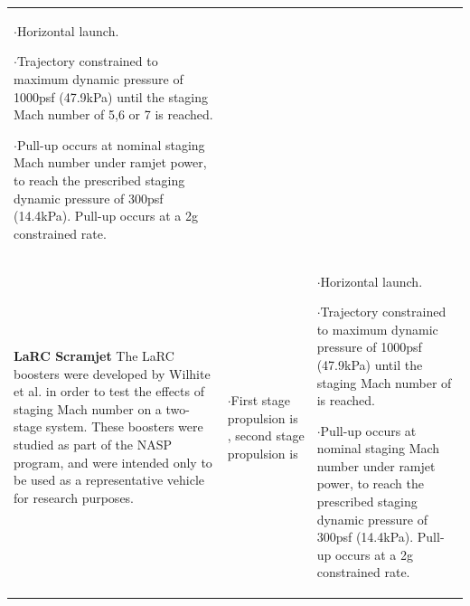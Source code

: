 \begin{xltabular}{\linewidth}{|X|X|X|}
	$\cdot$Horizontal launch.
	
	$\cdot$Trajectory constrained to maximum dynamic pressure of 1000psf (47.9kPa) until the staging Mach number of 5,6 or 7 is reached. 
	
	$\cdot$Pull-up occurs at nominal staging Mach number under ramjet power, to reach the prescribed staging dynamic pressure of 300psf (14.4kPa). Pull-up occurs at a 2g constrained rate. 
	\\
	
	\textbf{LaRC Scramjet}\cite{Wilhite1991}\newline\newline
	The LaRC boosters were developed by Wilhite et al.\cite{Wilhite1991} in order to test the effects of staging Mach number on a two-stage system. These boosters were studied as part of the NASP program, and were intended only to be used as a representative vehicle for research purposes.  
	&\small
	
	$\cdot$First stage propulsion is , second stage propulsion is
	&\small
	
	$\cdot$Horizontal launch.
	
	$\cdot$Trajectory constrained to maximum dynamic pressure of 1000psf (47.9kPa) until the staging Mach number of  is reached. 
	
	$\cdot$Pull-up occurs at nominal staging Mach number under ramjet power, to reach the prescribed staging dynamic pressure of 300psf (14.4kPa). Pull-up occurs at a 2g constrained rate. 
	\\
	

\end{xltabular}
